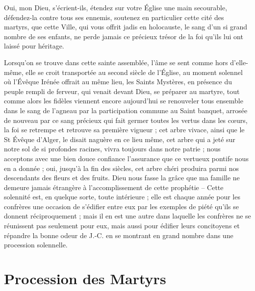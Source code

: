 \documentclass[11pt,a4paper]{report}
\begin{document}
Oui, mon Dieu, s'écrient-ils, étendez sur votre Église une main secourable, défendez-la contre tous ses ennemis, soutenez en particulier cette cité des martyrs, que cette Ville, qui vous offrit jadis en holocauste, le sang d'un si grand nombre de ses enfants, ne perde jamais ce précieux trésor de la foi qu'ils lui ont laissé pour héritage.

Lorsqu'on se trouve dans cette sainte assemblée, l'âme se sent comme hors d'elle-même, elle se croit transportée au second siècle de l'Église, au moment solennel où l'Évêque Irénée offrait au même lieu, les Saints Mystères, en présence du peuple rempli de ferveur, qui venait devant Dieu, se préparer au martyre, tout comme alors les fidèles viennent encore aujourd'hui se renouveler tous ensemble dans le sang de l'agneau par la participation commune au Saint banquet, arrosée de nouveau par ce sang précieux qui fait germer toutes les vertus dans les cœurs, la foi se retrempe et retrouve sa première vigueur ; cet arbre vivace, ainsi que le St Évêque d'Alger, le disait naguère en ce lieu même, cet arbre qui a jeté sur notre sol de si profondes racines, vivra toujours dans notre patrie ; nous acceptons avec une bien douce confiance l'assurance que ce vertueux pontife nous en a donnée ; oui, jusqu'à la fin des siècles, cet arbre chéri produira parmi nos descendants des fleurs et des fruits. Dieu nous fasse la grâce que ma famille ne demeure jamais étrangère à l'accomplissement de cette prophétie -- Cette solennité est, en quelque sorte, toute intérieure ; elle est chaque année pour les confrères une occasion de s'édifier entre eux par les exemples de piété qu'ils se donnent réciproquement ; mais il en est une autre dans laquelle les confrères ne se réunissent pas seulement pour eux, mais aussi pour édifier leurs concitoyens et répandre la bonne odeur de J.-C. en se montrant en grand nombre dans une procession solennelle.

\section*{Procession des Martyrs}
\end{document}
